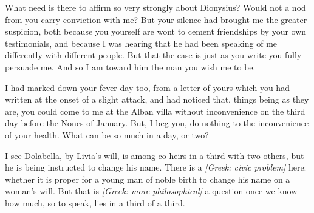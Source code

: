 

 What need is there to affirm so very strongly about Dionysius? Would not a nod from you carry conviction with me? But your silence had brought me the greater suspicion, both because you yourself are wont to cement friendships by your own testimonials, and because I was hearing that he had been speaking of me differently with different people. But that the case is just as you write you fully persuade me. And so I am toward him the man you wish me to be.

 I had marked down your fever-day too, from a letter of yours which you had written at the onset of a slight attack, and had noticed that, things being as they are, you could come to me at the Alban villa without inconvenience on the third day before the Nones of January. But, I beg you, do nothing to the inconvenience of your health. What can be so much in a day, or two?

 I see Dolabella, by Livia's will, is among co-heirs in a third with two others, but he is being instructed to change his name. There is a \textit{[Greek: civic problem]} here: whether it is proper for a young man of noble birth to change his name on a woman's will. But that is \textit{[Greek: more philosophical]} a question once we know how much, so to speak, lies in a third of a third.

